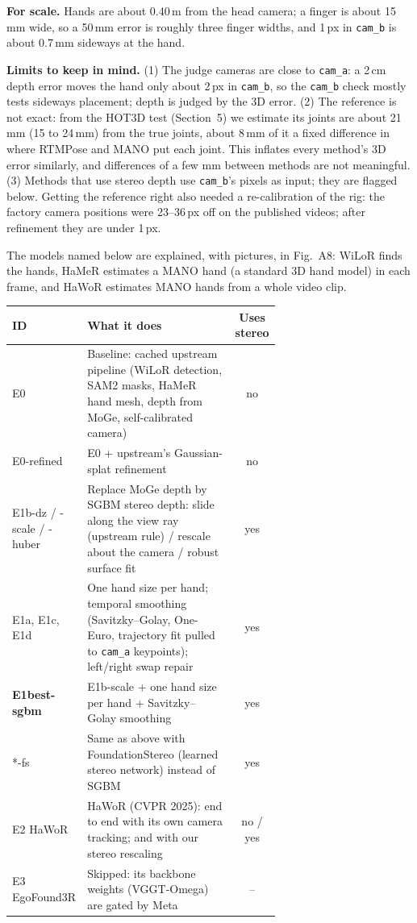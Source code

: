 \documentclass[10pt]{article}
\newcommand{\sect}[1]{\vspace{3pt}{\large\bfseries #1}\par\vspace{1pt}}
\begin{document}
\textbf{For scale.} Hands are about 0.40\,m from the head camera; a finger is about 15\,mm wide, so a 50\,mm error is
roughly three finger widths, and 1\,px in \texttt{cam\_b} is about 0.7\,mm sideways at the hand.

\textbf{Limits to keep in mind.} (1) The judge cameras are close to \texttt{cam\_a}: a 2\,cm depth error moves the hand
only about 2\,px in \texttt{cam\_b}, so the \texttt{cam\_b} check mostly tests sideways placement; depth is judged by the
3D error. (2) The reference is not exact: from the HOT3D test (Section~5) we estimate its joints are about 21\,mm (15
to 24\,mm) from the true joints, about 8\,mm of it a fixed difference in where RTMPose and MANO put each joint. This
inflates every method's 3D error similarly, and differences of a few mm between methods are not meaningful. (3) Methods that use stereo depth use \texttt{cam\_b}'s pixels as input; they are flagged below.
Getting the reference right also needed a re-calibration of the rig: the factory camera positions were 23--36\,px off on
the published videos; after refinement they are under 1\,px.

\sect{2. Experiments}
The models named below are explained, with pictures, in Fig.~A8: WiLoR finds the hands, HaMeR estimates a MANO hand
(a standard 3D hand model) in each frame, and HaWoR estimates MANO hands from a whole video clip.
\begin{table}[H]\small\centering
\begin{tabular}{@{}lp{0.655\linewidth}c@{}}
\toprule
ID & What it does & Uses stereo \\
\midrule
E0 & Baseline: cached upstream pipeline (WiLoR detection, SAM2 masks, HaMeR hand mesh, depth from MoGe, self-calibrated camera) & no \\
E0-refined & E0 + upstream's Gaussian-splat refinement & no \\
E1b-dz / -scale / -huber & Replace MoGe depth by SGBM stereo depth: slide along the view ray (upstream rule) / rescale about the camera / robust surface fit & yes \\
E1a, E1c, E1d & One hand size per hand; temporal smoothing (Savitzky--Golay, One-Euro, trajectory fit pulled to \texttt{cam\_a} keypoints); left/right swap repair & yes \\
\textbf{E1best-sgbm} & E1b-scale + one hand size per hand + Savitzky--Golay smoothing & yes \\
*-fs & Same as above with FoundationStereo (learned stereo network) instead of SGBM & yes \\
E2 HaWoR & HaWoR (CVPR 2025): end to end with its own camera tracking; and with our stereo rescaling & no / yes \\
E3 EgoFound3R & Skipped: its backbone weights (VGGT-Omega) are gated by Meta & -- \\
\bottomrule
\end{tabular}
\end{table}
\end{document}
